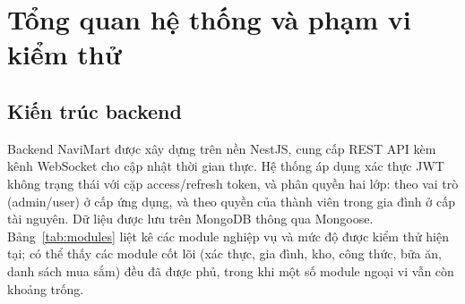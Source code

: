 \documentclass[12pt,a4paper]{article}
\begin{document}
\section{Tổng quan hệ thống và phạm vi kiểm thử}

\subsection{Kiến trúc backend}

Backend NaviMart được xây dựng trên nền NestJS, cung cấp REST API kèm kênh WebSocket cho cập nhật thời gian
thực. Hệ thống áp dụng xác thực JWT không trạng thái với cặp access/refresh token, và phân quyền hai lớp:
theo vai trò (admin/user) ở cấp ứng dụng, và theo quyền của thành viên trong gia đình ở cấp tài nguyên. Dữ
liệu được lưu trên MongoDB thông qua Mongoose. Bảng~\ref{tab:modules} liệt kê các module nghiệp vụ và mức độ
được kiểm thử hiện tại; có thể thấy các module cốt lõi (xác thực, gia đình, kho, công thức, bữa ăn, danh
sách mua sắm) đều đã được phủ, trong khi một số module ngoại vi vẫn còn khoảng trống.
\end{document}
